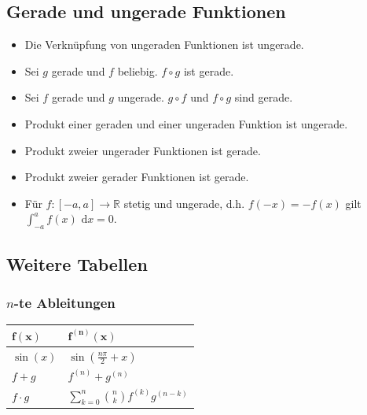 \documentclass[a4paper,10pt]{article}
\def\dx{\text{ d}x}
\begin{document}
\subsection{Gerade und ungerade Funktionen}
\begin{itemize}
  \item Die Verknüpfung von ungeraden Funktionen ist ungerade. 
  \item Sei $g$ gerade und $f$ beliebig. $f \circ g$ ist gerade.
  \item Sei $f$ gerade und $g$ ungerade. $g \circ f$ und $f \circ g$ sind gerade.
  \item Produkt einer geraden und einer ungeraden Funktion ist ungerade.
  \item Produkt zweier ungerader Funktionen ist gerade.
  \item Produkt zweier gerader Funktionen ist gerade.
  \item Für $f: [-a, a] \to \mathbb{R}$ stetig und ungerade, d.h. $f(-x) = -f(x)$ gilt $\int_{-a}^a f(x) \dx = 0$.
\end{itemize}


\subsection{Weitere Tabellen}

\subsubsection{$n$-te Ableitungen}
\begin{center}
  \begin{tabularx}{\linewidth}{>{\centering\arraybackslash}X>{\centering\arraybackslash}X}
  \toprule
  $\mathbf{f(x)}$ & $\mathbf{f^{(n)}(x)}$ \\
  \midrule
  $\sin(x)$ & $\sin(\frac{n\pi}{2} + x)$\\
  $f + g$ & $f^{(n)} + g^{(n)}$\\
  $f \cdot g$ & $\sum\limits_{k=0}^{n}\binom{n}{k}f^{(k)}g^{(n-k)}$\\
  \bottomrule
  \end{tabularx}
\end{center}
\end{document}
